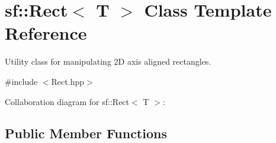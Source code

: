 \hypertarget{classsf_1_1_rect}{}\section{sf\+:\+:Rect$<$ T $>$ Class Template Reference}
\label{classsf_1_1_rect}


Utility class for manipulating 2D axis aligned rectangles.  




{\ttfamily \#include $<$Rect.\+hpp$>$}



Collaboration diagram for sf\+:\+:Rect$<$ T $>$\+:
\subsection*{Public Member Functions}
